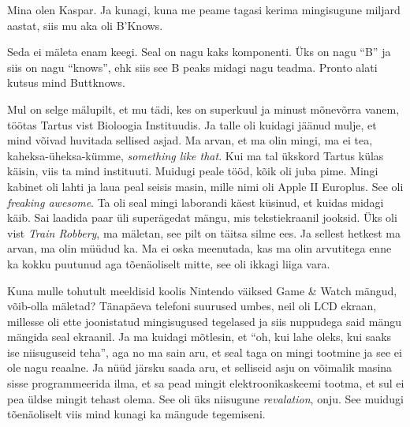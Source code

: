 

Mina olen Kaspar. Ja kunagi, kuna me peame tagasi kerima mingisugune miljard 
aastat, siis mu aka oli B'Knows. 


Seda ei mäleta enam keegi. Seal on nagu kaks komponenti. Üks on nagu 
\enquote{B} ja siis on nagu \enquote{knows}, ehk siis see B peaks  midagi nagu 
teadma. Pronto alati kutsus mind Buttknows.


Mul on selge mälupilt, et mu tädi, kes on superkuul ja minust mõnevõrra vanem, 
töötas Tartus
vist Bioloogia Instituudis. Ja  talle oli kuidagi jäänud mulje, et mind võivad 
huvitada sellised asjad. Ma arvan, et ma olin mingi, ma ei tea, 
kaheksa-üheksa-kümme, \emph{something like that}. Kui ma tal ükskord Tartus 
külas käisin, viis ta mind instituuti. Muidugi peale tööd, kõik oli juba pime. 
Mingi kabinet oli lahti ja laua peal seisis masin, mille nimi oli Apple II 
Europlus. See oli \emph{freaking awesome}. Ta oli 
seal mingi laborandi käest küsinud, et kuidas  midagi käib. Sai laadida paar 
üli superägedat mängu, mis tekstiekraanil jooksid. Üks oli vist \emph{Train 
Robbery}, ma mäletan, see pilt on täitsa silme ees. 
Ja sellest hetkest ma arvan, ma olin müüdud ka. Ma ei oska  meenutada, kas ma 
olin arvutitega enne ka kokku puutunud aga tõenäoliselt mitte, see oli ikkagi 
liiga  vara. 

Kuna mulle tohutult meeldisid koolis Nintendo väiksed Game \& 
Watch mängud, võib-olla mäletad? Tänapäeva 
telefoni suurused umbes, neil oli LCD ekraan, millesse oli ette joonistatud 
mingisugused tegelased ja siis nuppudega said mängu mängida seal 
ekraanil. Ja  ma kuidagi mõtlesin, et \enquote{oh, kui 
lahe oleks, kui saaks ise niisuguseid teha}, aga no ma sain aru, et seal taga 
on mingi tootmine ja see ei ole nagu reaalne. Ja nüüd järsku saada aru, et 
selliseid asju on võimalik  masina sisse programmeerida ilma, et sa pead mingit 
elektroonikaskeemi tootma, et sul ei pea üldse mingit tehast olema. See oli üks 
niisugune \emph{revalation}, onju. See muidugi  tõenäoliselt viis mind kunagi 
ka mängude tegemiseni. 

